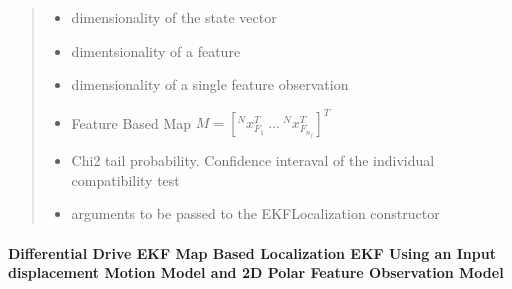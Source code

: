 \documentclass[letterpaper,10pt,english]{sphinxmanual}
\begin{document}
\begin{fulllineitems}
\begin{fulllineitems}
\begin{quote}
\begin{description}
\begin{itemize}
\item {} 
\sphinxAtStartPar
{} \textendash{} dimensionality of the state vector

\item {} 
\sphinxAtStartPar
{} \textendash{} dimentsionality of a feature

\item {} 
\sphinxAtStartPar
{} \textendash{} dimensionality of a single feature observation

\item {} 
\sphinxAtStartPar
{} \textendash{} Feature Based Map \(M =[^Nx_{F_1}^T~...~^Nx_{F_{n_f}}^T]^T\)

\item {} 
\sphinxAtStartPar
{} \textendash{} Chi2 tail probability. Confidence interaval of the individual compatibility test

\item {} 
\sphinxAtStartPar
{} \textendash{} arguments to be passed to the EKFLocalization constructor

\end{itemize}

\end{description}\end{quote}

\end{fulllineitems}


\end{fulllineitems}



\paragraph{Differential Drive EKF Map Based Localization EKF Using an Input displacement Motion Model and 2D Polar Feature Observation Model}
\label{\detokenize{FEKFMBLocalization:differential-drive-ekf-map-based-localization-ekf-using-an-input-displacement-motion-model-and-2d-polar-feature-observation-model}}
\begin{figure}[htbp]
\centering

\noindent{}
\end{figure}
\end{document}
